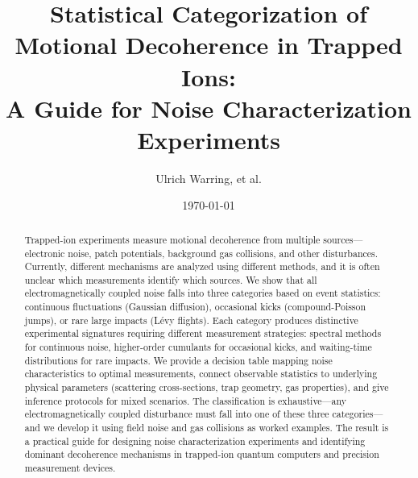 \documentclass[11pt,a4paper]{article}
\title{Statistical Categorization of Motional Decoherence in Trapped Ions: \\
A Guide for Noise Characterization Experiments}
\author[1]{Ulrich Warring, et al.}
\affil[1]{Physikalisches Institut, Universität Freiburg, Germany}
\date{\today}
\begin{document}
\maketitle

\begin{abstract}
Trapped-ion experiments measure motional decoherence from multiple sources—electronic noise, patch potentials, background gas collisions, and other disturbances. Currently, different mechanisms are analyzed using different methods, and it is often unclear which measurements identify which sources. We show that all electromagnetically coupled noise falls into three categories based on event statistics: continuous fluctuations (Gaussian diffusion), occasional kicks (compound-Poisson jumps), or rare large impacts (Lévy flights). Each category produces distinctive experimental signatures requiring different measurement strategies: spectral methods for continuous noise, higher-order cumulants for occasional kicks, and waiting-time distributions for rare impacts. We provide a decision table mapping noise characteristics to optimal measurements, connect observable statistics to underlying physical parameters (scattering cross-sections, trap geometry, gas properties), and give inference protocols for mixed scenarios. The classification is exhaustive—any electromagnetically coupled disturbance must fall into one of these three categories—and we develop it using field noise and gas collisions as worked examples. The result is a practical guide for designing noise characterization experiments and identifying dominant decoherence mechanisms in trapped-ion quantum computers and precision measurement devices.
\end{abstract}














\end{document}
